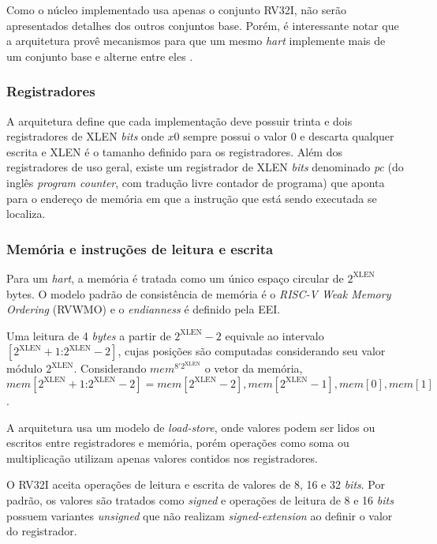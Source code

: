     Como o núcleo implementado usa apenas o conjunto RV32I, não serão apresentados 
    detalhes dos outros conjuntos base. Porém, é interessante notar que a arquitetura 
    provê mecanismos para que um mesmo \emph{hart} implemente mais de um conjunto base e alterne 
    entre eles \citep{RVS2}.

\subsubsection{Registradores}
\label{ssec:reg}

    A arquitetura define que cada implementação 
    deve possuir trinta e dois registradores de XLEN \emph{bits} onde $x0$ sempre possui o valor 0 e descarta
    qualquer escrita e XLEN é o tamanho definido para os registradores.
    Além dos registradores de uso geral, existe um registrador de XLEN 
    \emph{bits} denominado \emph{pc} (do inglês \emph{program counter}, com tradução livre contador de programa) 
    que aponta para o endereço de memória em que a instrução que está sendo executada se localiza.

\subsubsection{Memória e instruções de leitura e escrita}
\label{ssec:rw}

    Para um \emph{hart}, a memória é tratada como um único espaço circular de $2^{\text{XLEN}}$ bytes.
    O modelo padrão de consistência de memória é o \emph{RISC-V Weak Memory Ordering} (RVWMO) \citep{RVS1}
    e o \emph{endianness} é definido pela EEI.

    Uma leitura de 4 \emph{bytes} a partir de $2^{\text{XLEN}} - 2$ equivale ao intervalo 
    $[2^{\text{XLEN}}+1\text{:}2^{\text{XLEN}} - 2]$, cujas posições são computadas considerando seu valor módulo
    $2^{\text{XLEN}}$. Considerando $mem^{8'2^{\text{XLEN}}}$ o vetor da memória, 
    $mem[{2^{\text{XLEN}}+1\text{:}2^{\text{XLEN}} - 2}] = {mem[2^{\text{XLEN}} - 2], mem[2^{\text{XLEN}} - 1], mem[0], mem[1]}$.

    A arquitetura usa um modelo de \emph{load-store}, onde valores podem ser lidos ou escritos entre 
    registradores e memória, porém operações como soma ou multiplicação utilizam apenas valores contidos 
    nos registradores.

    O RV32I aceita operações de leitura e escrita de valores de 8, 16 e 32 \emph{bits}. Por padrão, os valores 
    são tratados como \emph{signed} e operações de leitura de 8 e 16 \emph{bits} possuem variantes \emph{unsigned}
    que não realizam \emph{signed-extension} ao definir o valor do registrador.

